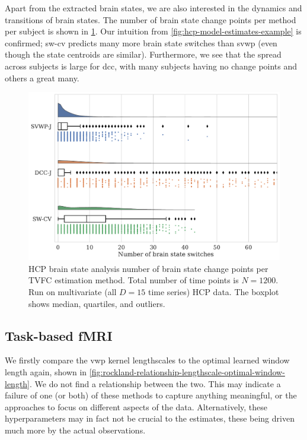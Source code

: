 Apart from the extracted brain states, we are also interested in the dynamics and transitions of brain states.
The number of brain state change points per method per subject is shown in \cref{fig:hcp-brain-state-change-point-counts}.
Our intuition from \cref{fig:hcp-model-estimates-example} is confirmed; \gls{sw-cv} predicts many more brain state switches than \gls{svwp} (even though the state centroids are similar).
Furthermore, we see that the spread across subjects is large for \gls{dcc}, with many subjects having no change points and others a great many.


\begin{figure}[t]
  \centering
  \includegraphics[width=\textwidth]{fig/hcp/d15/brain_states/k03/brain_state_switch_count}
  \caption{
    HCP brain state analysis number of brain state change points per TVFC estimation method.
    Total number of time points is $N = 1200$.
    Run on multivariate (all $D = 15$ time series) HCP data.
    The boxplot shows median, quartiles, and outliers.
  }
  \label{fig:hcp-brain-state-change-point-counts}
\end{figure}


\subsection{Task-based fMRI}
\label{subsec:rockland-results}

We firstly compare the \gls{vwp} kernel lengthscales to the optimal learned window length again, shown in \cref{fig:rockland-relationship-lengthscale-optimal-window-length}.
We do not find a relationship between the two.
This may indicate a failure of one (or both) of these methods to capture anything meaningful, or the approaches to focus on different aspects of the data.
Alternatively, these hyperparameters may in fact not be crucial to the estimates, these being driven much more by the actual observations.


